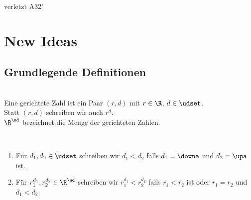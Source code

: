 verletzt A32'

\chapter{New Ideas}




\section{Grundlegende Definitionen}

\begin{dfn}\ \\
    Eine gerichtete Zahl ist ein Paar $(r,d)$ mit $r \in \R$, $d \in \udset$.\\
    Statt $(r,d)$ schreiben wir auch $r^d$.\\
    $\R^\ud$ bezeichnet die Menge der gerichteten Zahlen.
\end{dfn}


% 
% 


\begin{dfn}\ \\
    \begin{enumerate}
        \item Für $d_1,d_2 \in \udset$ schreiben wir $d_1 < d_2$ falls $d_1 = \downa$ und $d_2 = \upa$ ist. 
        \item Für $r_1^{d_1},r_2^{d_2} \in \R^\ud$ schreiben wir $r_1^{d_1} < r_2^{d_2}$ falls $r_1 < r_2$ ist oder $r_1 = r_2$ und $d_1 < d_2$.
    \end{enumerate}
\end{dfn}


